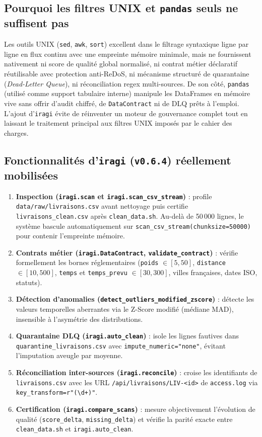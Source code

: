 \documentclass[11pt,a4paper]{article}
\begin{document}
\subsection{Pourquoi les filtres UNIX et \texttt{pandas} seuls ne suffisent pas}
Les outils UNIX (\texttt{sed}, \texttt{awk}, \texttt{sort}) excellent dans le filtrage syntaxique ligne par ligne en flux continu avec une empreinte m\'emoire minimale, mais ne fournissent nativement ni score de qualit\'e global normalis\'e, ni contrat m\'etier d\'eclaratif r\'eutilisable avec protection anti-ReDoS, ni m\'ecanisme structur\'e de quarantaine (\emph{Dead-Letter Queue}), ni r\'econciliation regex multi-sources. De son c\^ot\'e, \texttt{pandas} (utilis\'e comme support tabulaire interne) manipule les DataFrames en m\'emoire vive sans offrir d'audit chiffr\'e, de \texttt{DataContract} ni de DLQ pr\^ets \`a l'emploi. L'ajout d'\texttt{iragi} \'evite de r\'einventer un moteur de gouvernance complet tout en laissant le traitement principal aux filtres UNIX impos\'es par le cahier des charges.

\subsection{Fonctionnalit\'es d'\texttt{iragi} (\texttt{v0.6.4}) r\'eellement mobilis\'ees}
\begin{enumerate}
    \item \textbf{Inspection (\texttt{iragi.scan} et \texttt{iragi.scan\_csv\_stream})} : profile \texttt{data/raw/livraisons.csv} avant nettoyage puis certifie \texttt{livraisons\_clean.csv} apr\`es \texttt{clean\_data.sh}. Au-del\`a de 50\,000 lignes, le syst\`eme bascule automatiquement sur \texttt{scan\_csv\_stream(chunksize=50000)} pour contenir l'empreinte m\'emoire.
    \item \textbf{Contrats m\'etier (\texttt{iragi.DataContract}, \texttt{validate\_contract})} : v\'erifie formellement les bornes r\'eglementaires (\texttt{poids} $\in [5,50]$, \texttt{distance} $\in [10,500]$, \texttt{temps} et \texttt{temps\_prevu} $\in [30,300]$, villes fran\c{c}aises, dates ISO, statuts).
    \item \textbf{D\'etection d'anomalies (\texttt{detect\_outliers\_modified\_zscore})} : d\'etecte les valeurs temporelles aberrantes via le Z-Score modifi\'e (m\'ediane MAD), insensible \`a l'asym\'etrie des distributions.
    \item \textbf{Quarantaine DLQ (\texttt{iragi.auto\_clean})} : isole les lignes fautives dans \texttt{quarantine\_livraisons.csv} avec \texttt{impute\_numeric="none"}, \'evitant l'imputation aveugle par moyenne.
    \item \textbf{R\'econciliation inter-sources (\texttt{iragi.reconcile})} : croise les identifiants de \texttt{livraisons.csv} avec les URL \texttt{/api/livraisons/LIV-<id>} de \texttt{access.log} via \texttt{key\_transform=r"(\textbackslash d+)"}.
    \item \textbf{Certification (\texttt{iragi.compare\_scans})} : mesure objectivement l'\'evolution de qualit\'e (\texttt{score\_delta}, \texttt{missing\_delta}) et v\'erifie la parit\'e exacte entre \texttt{clean\_data.sh} et \texttt{iragi.auto\_clean}.
\end{enumerate}
\end{document}
